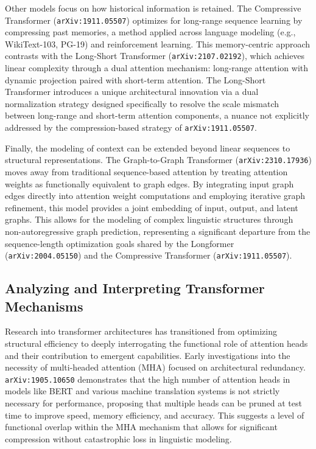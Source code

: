\documentclass[11pt]{article}
\begin{document}
Other models focus on how historical information is retained. The Compressive Transformer (\texttt{arXiv:1911.05507}) optimizes for long-range sequence learning by compressing past memories, a method applied across language modeling (e.g., WikiText-103, PG-19) and reinforcement learning. This memory-centric approach contrasts with the Long-Short Transformer (\texttt{arXiv:2107.02192}), which achieves linear complexity through a dual attention mechanism: long-range attention with dynamic projection paired with short-term attention. The Long-Short Transformer introduces a unique architectural innovation via a dual normalization strategy designed specifically to resolve the scale mismatch between long-range and short-term attention components, a nuance not explicitly addressed by the compression-based strategy of \texttt{arXiv:1911.05507}.

Finally, the modeling of context can be extended beyond linear sequences to structural representations. The Graph-to-Graph Transformer (\texttt{arXiv:2310.17936}) moves away from traditional sequence-based attention by treating attention weights as functionally equivalent to graph edges. By integrating input graph edges directly into attention weight computations and employing iterative graph refinement, this model provides a joint embedding of input, output, and latent graphs. This allows for the modeling of complex linguistic structures through non-autoregressive graph prediction, representing a significant departure from the sequence-length optimization goals shared by the Longformer (\texttt{arXiv:2004.05150}) and the Compressive Transformer (\texttt{arXiv:1911.05507}).

\subsection{Analyzing and Interpreting Transformer Mechanisms}

Research into transformer architectures has transitioned from optimizing structural efficiency to deeply interrogating the functional role of attention heads and their contribution to emergent capabilities. Early investigations into the necessity of multi-headed attention (MHA) focused on architectural redundancy. \texttt{arXiv:1905.10650} demonstrates that the high number of attention heads in models like BERT and various machine translation systems is not strictly necessary for performance, proposing that multiple heads can be pruned at test time to improve speed, memory efficiency, and accuracy. This suggests a level of functional overlap within the MHA mechanism that allows for significant compression without catastrophic loss in linguistic modeling.
\end{document}
